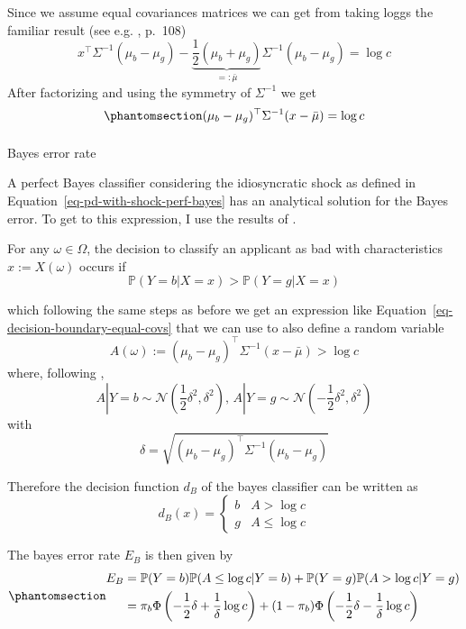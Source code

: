\documentclass[
  12pt,
]{article}
\makeatletter
\let\oldparagraph\paragraph
\renewcommand{\paragraph}{
    \@ifstar
      \xxxParagraphStar
      \xxxParagraphNoStar
  }
\newcommand{\xxxParagraphStar}[1]{\oldparagraph*{#1}\mbox{}}
\newcommand{\xxxParagraphNoStar}[1]{\oldparagraph{#1}\mbox{}}
\makeatother
\begin{document}
Since we assume equal covariances matrices we can get from taking loggs
the familiar result (see e.g. \textcite{hastie2009elements}, p.~108) \[
x^\top \Sigma^{-1} (\mu_b - \mu_g) - \underbrace{\frac{1}{2} (\mu_b + \mu_g)}_{=:\bar{\mu}} \Sigma^{-1}(\mu_b - \mu_g) =
\log c
\] After factorizing and using the symmetry of \(\Sigma^{-1}\) we get
\begin{equation}\protect\phantomsection\label{eq-decision-boundary-equal-covs}{
(\mu_b - \mu_g)^\top \Sigma^{-1} (x - \bar{\mu})  = \log c
}\end{equation}

\paragraph{Bayes error rate}\label{sec-derivation-bayes-rate}

A perfect Bayes classifier considering the idiosyncratic shock as
defined in Equation~\ref{eq-pd-with-shock-perf-bayes} has an analytical
solution for the Bayes error. To get to this expression, I use the
results of \textcite{Ripley_1996}.

For any \(\omega \in \Omega\), the decision to classify an applicant as
bad with characteristics \(x := X(\omega)\) occurs if \[
\mathbb{P}(Y=b | X = x) > \mathbb{P}(Y=g | X = x)
\]

which following the same steps as before we get an expression like
Equation~\ref{eq-decision-boundary-equal-covs} that we can use to also
define a random variable \[
A(\omega) := (\mu_b - \mu_g)^\top \Sigma^{-1} (x - \bar{\mu}) >
\log c
\] where, following \textcite{Ripley_1996}, \[
A | Y = b \sim \mathcal{N}\left(\frac{1}{2} \delta^2, \delta^2 \right), \,
A | Y = g \sim \mathcal{N}\left(-\frac{1}{2} \delta^2, \delta^2 \right)
\] with \[
\delta = \sqrt{(\mu_b - \mu_g)^\top \Sigma^{-1} (\mu_b - \mu_g)}
\]

Therefore the decision function \(d_B\) of the bayes classifier can be
written as \[
d_B(x) = \begin{cases}
    b & A > \log c \\
    g & A \leq \log c
\end{cases}
\]

The bayes error rate \(E_B\) is then given by
\begin{equation}\protect\phantomsection\label{eq-bayes-error-rate-formula}{
\begin{aligned}
E_B &= 
    \mathbb{P}(Y = b) \mathbb{P}(A \leq \log c | Y = b) +
    \mathbb{P}(Y = g)  \mathbb{P}(A > \log c | Y = g)
\\
&=
    \pi_b \Phi\left(-\frac{1}{2}\delta + \frac{1}{\delta} \log c\right) +
    (1-\pi_b) \Phi\left(-\frac{1}{2}\delta - \frac{1}{\delta} \log c\right)
\end{aligned}
}\end{equation}
\end{document}
